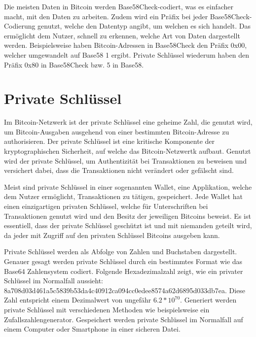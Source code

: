 Die meisten Daten in Bitcoin werden Base58Check-codiert, was es einfacher macht, mit den Daten zu arbeiten. Zudem wird ein Präfix
bei jeder Base58Check-Codierung genutzt, welche den Datentyp angibt, um welchen es sich handelt. Das ermöglicht dem Nutzer, schnell
zu erkennen, welche Art von Daten dargestellt werden. Beispielsweise haben Bitcoin-Adressen in Base58Check den Präfix 0x00, welcher
umgewandelt auf Base58 1 ergibt. Private Schlüssel wiederum haben den Präfix 0x80 in Base58Check bzw. 5 in Base58.

\section{Private Schlüssel}
Im Bitcoin-Netzwerk ist der private Schlüssel eine geheime Zahl, die genutzt wird, um Bitcoin-Ausgaben ausgehend von einer 
bestimmten Bitcoin-Adresse zu authorisieren. Der private Schlüssel ist eine kritische Komponente der kryptographischen Sicherheit,
auf welche das Bitcoin-Netzwertk aufbaut. Genutzt wird der private Schlüssel, um Authentizität bei Transaktionen zu beweisen und
versichert dabei, dass die Transaktionen nicht verändert oder gefälscht sind.

Meist sind private Schlüssel in einer sogenannten Wallet, eine Applikation, welche dem Nutzer ermöglicht, Transaktionen zu tätigen,
gespeichert. Jede Wallet hat einen einzigartigen privaten Schlüssel, welche für Unterschriften bei Transaktionen genutzt wird und
den Besitz der jeweiligen Bitcoins beweist. Es ist essentiell, dass der private Schlüssel geschützt ist und mit niemanden geteilt
wird, da jeder mit Zugriff auf den privaten Schlüssel Bitcoins ausgeben kann.

Private Schlüssel werden als Abfolge von Zahlen und Buchstaben dargestellt. Genauer gesagt werden private Schlüssel durch ein
bestimmtes Format wie das Base64 Zahlensystem codiert. Folgende Hexadezimalzahl zeigt, wie ein privater Schlüssel im 
Normalfall aussieht: 8a708d03d461a5c5839b53da4c40912ca094cc0edee8574a62d6895d033db7ea. Diese Zahl entspricht einem Dezimalwert 
von ungefähr \( 6.2 * 10^{70} \). Generiert werden private Schlüssel mit verschiedenen Methoden wie beispielsweise ein 
Zufallszahlengenerator. Gespeichert werden private Schlüssel im Normalfall auf einem Computer oder Smartphone in einer sicheren 
Datei.

